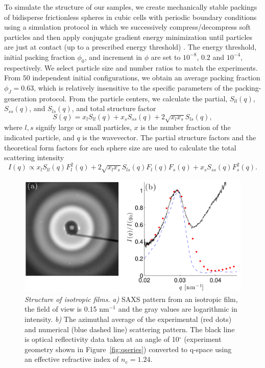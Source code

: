 To simulate the structure of our samples, we create mechanically stable packings of bidisperse frictionless spheres in cubic cells with periodic boundary conditions using a simulation protocol in which we successively compress/decompress soft particles and then apply conjugate gradient energy minimization until particles are just at contact (up to a prescribed energy threshold) \cite{Gao:2006p061304}.  
The energy threshold, initial packing fraction $\phi_0$, and increment in $\phi$ are set to $10^{-8}$, $0.2$ and $10^{-4}$, respectively.  
We select particle size and number ratios to match the experiments. 
From $50$ independent initial configurations, we obtain an average packing fraction $\phi_J = 0.63$, which is relatively insensitive to the specific parameters of the packing-generation protocol.  
From the particle centers, we calculate the partial, $S_{ll}(q)$, $S_{ss}(q)$, and $S_{ls}(q)$, and total structure factor 
\begin{equation}\label{eqn:structure-factor}
S(q) = x_l S_{ll}(q) + x_s S_{ss}(q) + 2\sqrt{x_l x_s} S_{ls}(q),
\end{equation}
 where $l,s$ signify large or small particles, $x$ is the number fraction of the indicated particle, and $q$ is the wavevector. 
The partial structure factors and the theoretical form factors for each sphere size are used to calculate the total scattering intensity 
\begin{equation}\label{eqn:total-scattering}
I(q) \propto x_l S_{ll}(q) F_l^2(q) + 2\sqrt{x_l x_s}S_{ls}(q) F_l(q) F_s(q) + x_s S_{ss}(q) F_s^2(q).
\end{equation}

	
\begin{figure}[htbp]
\centering
\includegraphics[width=.9\textwidth]{figures/structure_100128.pdf}
\caption{\label{fig:structure} \emph{Structure of isotropic films.}
	\emph{a)} SAXS pattern from an isotropic film, the field of view is 0.15 nm$^{-1}$ and the gray values are logarithmic in intensity.
	\emph{b)} The azimuthal average of the experimental (red dots) and numerical (blue dashed line) scattering pattern.  The black line is optical reflectivity data taken at an angle of 10$^{\circ}$ (experiment geometry shown in Figure~\ref{fig:qseries}) converted to q-space using an effective refractive index of $n_{e}=1.24$.}
\end{figure}


